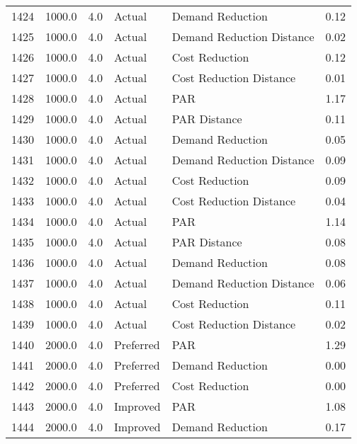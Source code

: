 \begin{longtable}{lrrllr}
1424 &       1000.0 &     4.0 &         Actual &           Demand Reduction &   0.12 \\
1425 &       1000.0 &     4.0 &         Actual &  Demand Reduction Distance &   0.02 \\
1426 &       1000.0 &     4.0 &         Actual &             Cost Reduction &   0.12 \\
1427 &       1000.0 &     4.0 &         Actual &    Cost Reduction Distance &   0.01 \\
1428 &       1000.0 &     4.0 &         Actual &                        PAR &   1.17 \\
1429 &       1000.0 &     4.0 &         Actual &               PAR Distance &   0.11 \\
1430 &       1000.0 &     4.0 &         Actual &           Demand Reduction &   0.05 \\
1431 &       1000.0 &     4.0 &         Actual &  Demand Reduction Distance &   0.09 \\
1432 &       1000.0 &     4.0 &         Actual &             Cost Reduction &   0.09 \\
1433 &       1000.0 &     4.0 &         Actual &    Cost Reduction Distance &   0.04 \\
1434 &       1000.0 &     4.0 &         Actual &                        PAR &   1.14 \\
1435 &       1000.0 &     4.0 &         Actual &               PAR Distance &   0.08 \\
1436 &       1000.0 &     4.0 &         Actual &           Demand Reduction &   0.08 \\
1437 &       1000.0 &     4.0 &         Actual &  Demand Reduction Distance &   0.06 \\
1438 &       1000.0 &     4.0 &         Actual &             Cost Reduction &   0.11 \\
1439 &       1000.0 &     4.0 &         Actual &    Cost Reduction Distance &   0.02 \\
1440 &       2000.0 &     4.0 &      Preferred &                        PAR &   1.29 \\
1441 &       2000.0 &     4.0 &      Preferred &           Demand Reduction &   0.00 \\
1442 &       2000.0 &     4.0 &      Preferred &             Cost Reduction &   0.00 \\
1443 &       2000.0 &     4.0 &       Improved &                        PAR &   1.08 \\
1444 &       2000.0 &     4.0 &       Improved &           Demand Reduction &   0.17 \\

\end{longtable}
